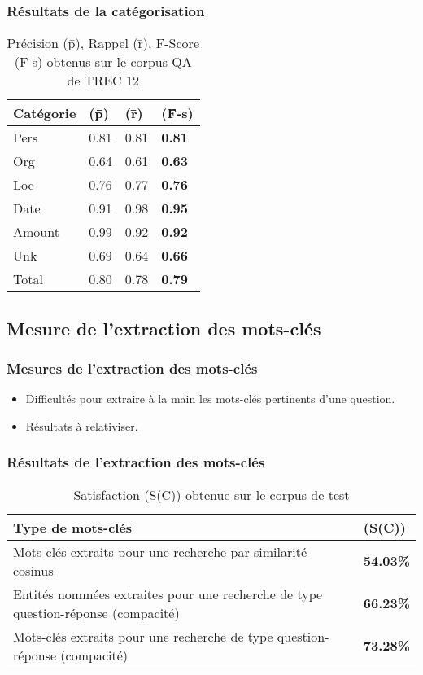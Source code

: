 \documentclass[xcolor=dvipsnames]{beamer}
\begin{document}
\frame
{
    \frametitle{Résultats de la catégorisation}
    \begin{table}[h]
        \begin{center}
            \begin{tabular}{|p{2.5cm}|l|l|l|}
                \hline
                Catégorie & (\={p}) & (\={r}) & (\={F}-s) \\
                \hline
                Pers & 0.81 & 0.81 & \textbf{0.81} \\
                \hline
                Org & 0.64 & 0.61 & \textbf{0.63} \\
                \hline
                Loc & 0.76 & 0.77 & \textbf{0.76} \\
                \hline
                Date & 0.91 & 0.98 & \textbf{0.95} \\
                \hline
                Amount & 0.99 & 0.92 & \textbf{0.92} \\
                \hline
                Unk & 0.69 & 0.64 & \textbf{0.66} \\
                \hline
                \hline
                Total & 0.80 & 0.78 & \textbf{0.79} \\
                \hline
            \end{tabular}
            \caption{Précision (\={p}), Rappel (\={r}), F-Score (\={F}-s) obtenus sur le corpus QA de TREC 12}
        \end{center}
    \end{table}
} 
\subsection{Mesure de l'extraction des mots-clés}
\frame
{
    \frametitle{Mesures de l'extraction des mots-clés}
    \begin{itemize}
      \item<1-> Difficultés pour extraire \og à la main \fg les mots-clés pertinents d'une question.
      \item<2-> Résultats à relativiser.
    \end{itemize}
}
\frame 
{
    \frametitle{Résultats de l'extraction des mots-clés}
    \begin{table}[htbp]
        \begin{center}
            \begin{tabular}{|p{8cm}|l|}
                \hline
                Type de mots-clés & (S(C)) \\
                \hline
                Mots-clés extraits pour une recherche par similarité cosinus & \textbf{54.03\%} \\
                \hline
                Entités nommées extraites pour une recherche de type question-réponse (compacité) & \textbf{66.23\%} \\
                \hline
                Mots-clés extraits pour une recherche de type question-réponse (compacité) & \textbf{73.28\%} \\
                \hline
            \end{tabular}
            \caption{Satisfaction (S(C)) obtenue sur le corpus de test}
        \end{center}
    \end{table}
}
\end{document}
